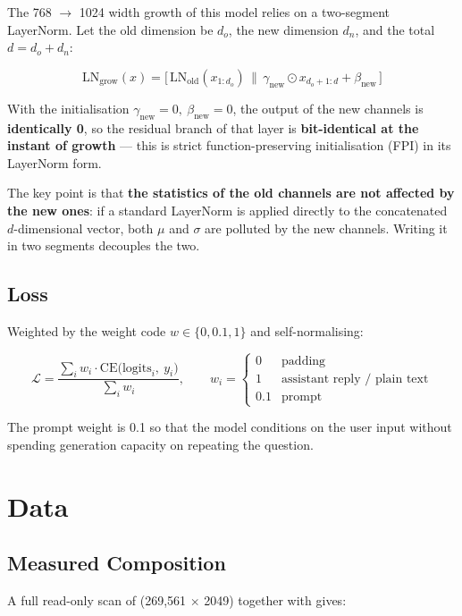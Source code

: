 The 768 $\rightarrow$ 1024 width growth of this model relies on a two-segment LayerNorm.
Let the old dimension be $d_o$, the new dimension $d_n$, and the total
$d = d_o + d_n$:

\[
\text{LN}_{\text{grow}}(x) =
\big[\,\text{LN}_{\text{old}}(x_{1:d_o}) \,\big\|\, \gamma_{\text{new}} \odot x_{d_o+1:d} + \beta_{\text{new}} \,\big]
\]

With the initialisation $\gamma_{\text{new}} = 0,\ \beta_{\text{new}} = 0$, the output of
the new channels is \textbf{identically 0}, so the residual branch of that layer is
\textbf{bit-identical at the instant of growth} --- this is strict function-preserving
initialisation (FPI) in its LayerNorm form.

The key point is that \textbf{the statistics of the old channels are not affected by the
new ones}: if a standard LayerNorm is applied directly to the concatenated
$d$-dimensional vector, both $\mu$ and $\sigma$ are polluted by the new channels. Writing
it in two segments decouples the two.

\subsection{Loss}
\label{sec:en-arch-loss}

Weighted by the weight code $w \in \{0, 0.1, 1\}$ and self-normalising:

\[
\mathcal{L} = \frac{\sum_{i} w_i \cdot \text{CE}\big(\text{logits}_i,\ y_i\big)}{\sum_i w_i},
\qquad
w_i = \begin{cases}
0 & \text{padding} \\
1 & \text{assistant reply / plain text} \\
0.1 & \text{prompt}
\end{cases}
\]

The prompt weight is 0.1 so that the model conditions on the user input without spending
generation capacity on repeating the question.

\section{Data}
\label{sec:en-data}

\subsection{Measured Composition}
\label{sec:en-data-composition}

A full read-only scan of 
(269,561 $\times$ 2049) together with  gives:

